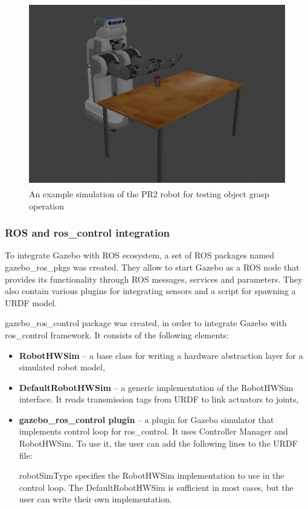\documentclass[english,inz,shortabstract]{iithesis}
\newcommand{\val}[1]{\textbf{\textsf{#1}}}
\begin{document}
	\begin{figure}[ht]
		\centering 
		\captionsetup{margin=2.5cm} 
		\includegraphics[height=8cm]{img/gazebo_pr2.png}
		\caption{An example simulation of the PR2 robot for testing object grasp operation}
		\label{fig:gazebo_pr2}
	\end{figure}

	\subsubsection{ROS and ros\_control integration}
	To integrate Gazebo with ROS ecosystem, a set of ROS packages named \textsf{gazebo\_ros\_pkgs} was created. They allow to start Gazebo as a ROS node that provides its functionality through ROS messages, services and parameters. They also contain various plugins for integrating sensors and a script for spawning a URDF model.

	\textsf{gazebo\_ros\_control} package was created, in order to integrate Gazebo with \textsf{ros\_control} framework. It consists of the following elements:
	\begin{itemize}
		\item \val{RobotHWSim} -- a base class for writing a hardware abstraction layer for a simulated robot model,
		\item \val{DefaultRobotHWSim} -- a generic implementation of the RobotHWSim interface. It reads transmission tags from URDF to link actuators to joints,
		\item \textbf{\textsf{gazebo\_ros\_control} plugin} -- a plugin for Gazebo simulator that implements control loop for ros\_control. It uses Controller Manager and RobotHWSim. To use it, the user can add the following lines to the URDF file:
		
		\textsf{robotSimType} specifies the RobotHWSim implementation to use in the control loop. The \mbox{DefaultRobotHWSim} is sufficient in most cases, but the user can write their own implementation.
	\end{itemize}
\end{document}
